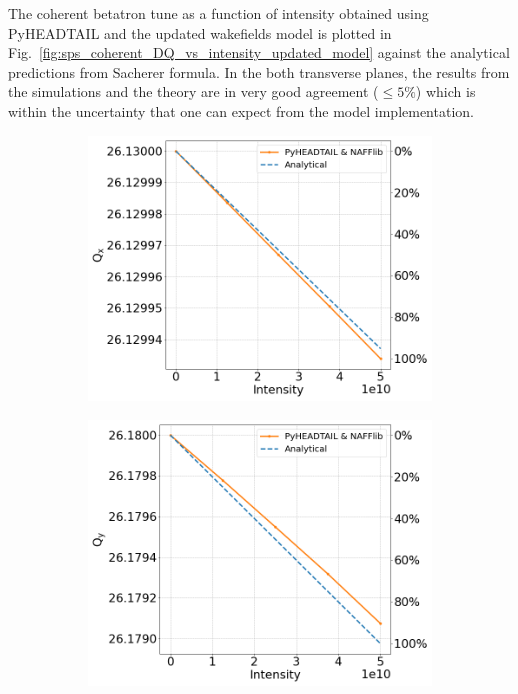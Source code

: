  The coherent betatron tune as a function of intensity obtained using PyHEADTAIL and the updated wakefields model is plotted in Fig.~\ref{fig:sps_coherent_DQ_vs_intensity_updated_model} against the analytical predictions from Sacherer formula. In the both transverse planes, the results from the simulations and the theory are in very good agreement ($\leq 5\%$) which is within the uncertainty that one can expect from the model implementation. 

\begin{figure}[!ht]
    \centering
    \begin{subfigure}[t]{0.45\textwidth}
        \centering
        \includegraphics[width=1\textwidth]{images/Ch7/Qx_vs_intensity_complete_impedance_sps_q26model_updated_MD2018_parameters_integer.png}
    \end{subfigure}
    \hfill
    \begin{subfigure}[t]{0.45\textwidth}
        \centering
        \includegraphics[width=1\textwidth]{images/Ch7/Qy_vs_intensity_complete_impedance_sps_q26model_updated_MD2018_parameters_integer.png}

\end{subfigure}
\end{figure}
